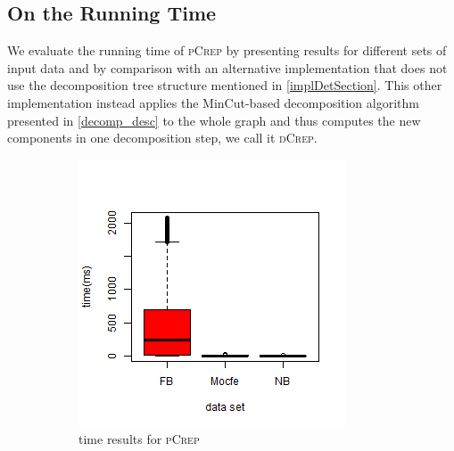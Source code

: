 \documentclass[a4paper,UKenglish,cleveref, autoref, thm-restate,authorcolumns]{lipics-v2019}
\newcommand{\adjDel}{\textsc{pCrep}}
\newcommand{\directDecomp}{\textsc{dCrep}}
\begin{document}
\subsection{On the Running Time}
	We evaluate the running time of \adjDel{} by presenting results for different sets of 
	input data and by comparison with an alternative implementation that does not use the decomposition tree 
	structure mentioned in \cref{implDetSection}.
	This other implementation instead applies the MinCut-based decomposition algorithm presented in \cref{decomp_desc}
	to the whole graph and thus computes the new components in one decomposition step, we call it \directDecomp{}.

\begin{figure}[h]
	\centering
	\begin{minipage}{0.48\linewidth}
		\begin{subfigure}[b]{\linewidth}
			\includegraphics*[width=\linewidth]{"plots/time_all_filtered_decompTree"}
			\caption{time results for \adjDel}
		\end{subfigure}		
	\end{minipage}
	\begin{minipage}{0.48\linewidth}
		\begin{subfigure}[b]{\linewidth}

\end{subfigure}
\end{minipage}
\end{figure}
\end{document}
